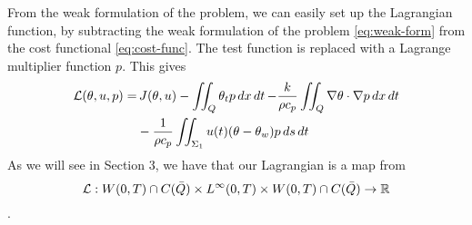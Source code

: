 From the weak formulation of the problem, we can easily set up the Lagrangian function, by subtracting the weak formulation of the problem \eqref{eq:weak-form} from the cost functional \eqref{eq:cost-func}. The test function is replaced with a Lagrange multiplier function $p$. This gives
\begin{equation}
  \begin{aligned}\label{eq:lagrangian-raw}
  \mathcal{L}(\theta, u, p) = &\,J(\theta, u) - \iint_Q \theta_t p\mathop{dx}\mathop{dt} - \frac{k}{\rho c_p}\iint_Q\nabla\theta \cdot \nabla p \mathop{dx}\mathop{dt} \\
  &- \frac{1}{\rho c_p}\iint_{\Sigma_1} u(t)(\theta - \theta_w)p \mathop{ds}\mathop{dt}
  \end{aligned}
\end{equation}
As we will see in Section 3, we have that our Lagrangian is a map from 
\begin{equation*}
    \mathcal{L} : W(0,T)\cap C(\bar{Q}) \times L^{\infty}(0,T) \times  W(0,T) \cap C(\bar{Q}) \rightarrow \mathbb{R}
\end{equation*}.

